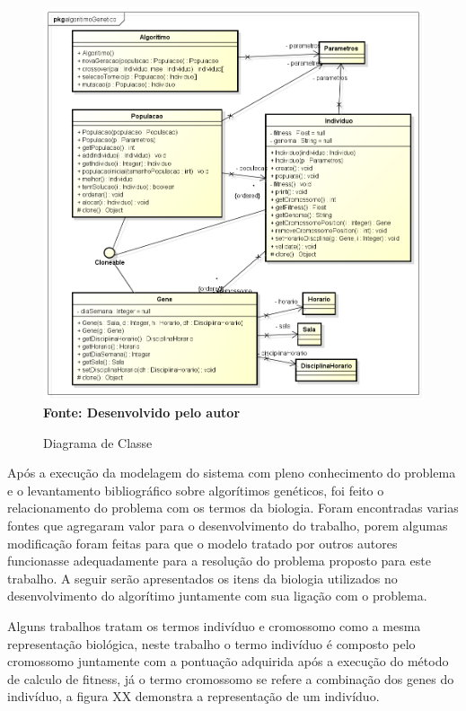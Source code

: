 \begin{figure}[!htb]
\caption[Diagrama de Classe]{Diagrama de Classe}
\label{fig:figura3}
\centering
\includegraphics[scale=0.6]{imagens/diagramaClasse.png}
\\ \textbf{\footnotesize Fonte: Desenvolvido pelo autor}
\end{figure}


Após a execução da modelagem do sistema com pleno conhecimento do problema e o levantamento bibliográfico sobre algorítimos genéticos, foi feito o relacionamento do problema com os termos da biologia. Foram encontradas varias fontes que agregaram valor para o desenvolvimento do trabalho, porem algumas modificação foram feitas para que o modelo tratado por outros autores funcionasse adequadamente para a resolução do problema proposto para este trabalho. A seguir serão apresentados os itens da biologia utilizados no desenvolvimento do algorítimo juntamente com sua ligação com o problema.\par


Alguns trabalhos tratam os termos indivíduo e cromossomo como a mesma representação biológica, neste trabalho o termo indivíduo é composto pelo cromossomo juntamente com a pontuação adquirida após a execução do método de calculo de fitness, já o termo cromossomo se refere a combinação dos genes do indivíduo, a figura XX demonstra a representação de um indivíduo.\par

